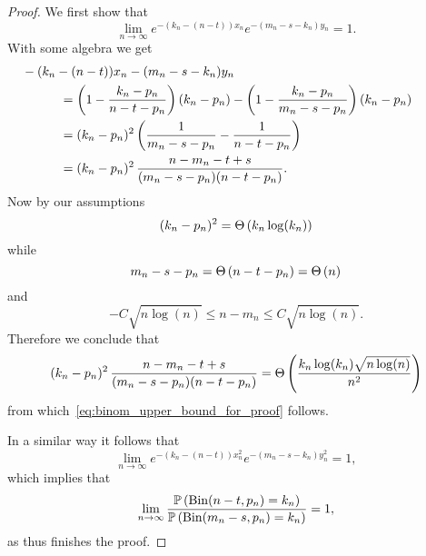 \begin{appendices}
\begin{proof}
We first show that 
\begin{equation}\label{eq:binom_upper_bound_for_proof}
	\lim_{n \to \infty} e^{-(k_n - (n-t))x_n}e^{-(m_n - s - k_n)y_n} = 1.
\end{equation}
With some algebra we get
\begin{align*}
	&\hspace{-30pt}-(k_n - (n-t))x_n - (m_n - s - k_n)y_n\\
	&= \left(1 - \frac{k_n -p_n}{n - t -p_n}\right)(k_n - p_n) 
		- \left(1 - \frac{k_n - p_n}{m_n - s - p_n}\right)(k_n - p_n)\\
	&= (k_n - p_n)^2 \left(\frac{1}{m_n - s - p_n} - \frac{1}{n - t - p_n}\right)\\
	&= (k_n - p_n)^2 \, \frac{n - m_n - t + s}{(m_n - s - p_n)(n - t - p_n)}.
\end{align*}
Now by our assumptions
\[
	(k_n - p_n)^2 = \Theta\left(k_n \log(k_n)\right)
\]
while
\[
	m_n - s - p_n = \Theta\left(n - t - p_n\right) = \Theta\left(n\right)
\]
and
\[
	-C \sqrt{n\log(n)} \le n - m_n \le C\sqrt{n \log(n)}.
\]
Therefore we conclude that
\[
	(k_n - p_n)^2 \, \frac{n - m_n - t + s}{(m_n - s - p_n)(n - t - p_n)} 
	= \Theta\left(\frac{k_n \log(k_n) \sqrt{n\log(n)}}{n^2}\right)
\]
from which~\eqref{eq:binom_upper_bound_for_proof} follows. 

In a similar way it follows that
\[
	\lim_{n \to \infty} e^{-(k_n - (n-t))x_n^2}e^{-(m_n - s - k_n)y_n^2} = 1,
\]
which implies that
\[
	\lim_{n \to \infty} \frac{\mathbb{P}\left(\mathrm{Bin}(n-t,p_n) = k_n\right)}{\mathbb{P}\left(\mathrm{Bin}(m_n-s,p_n) = k_n\right)}
	= 1,
\] 
as thus finishes the proof.
\end{proof}


\end{appendices}
